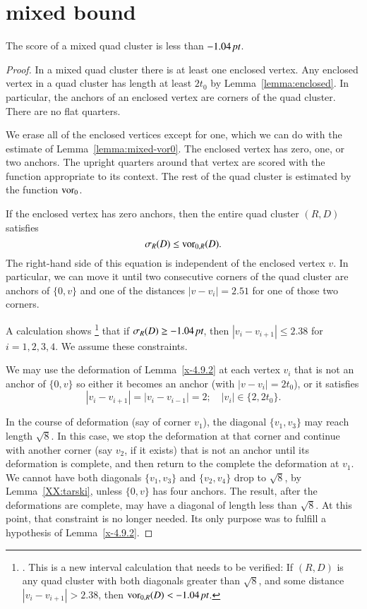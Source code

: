 \section{mixed bound} %

\begin{lemma} \label{lemma:1.04}
The score of a mixed quad cluster is less than $-1.04\,\hbox{\it pt}$.
\end{lemma}

\begin{proof}
In a mixed quad cluster there is at least one enclosed vertex.
Any enclosed vertex in a quad cluster has length at least $2t_0$
by Lemma~\ref{lemma:enclosed}. In particular, the anchors of an
enclosed vertex are corners of the quad cluster. There are no flat
quarters.

We erase all of the enclosed vertices except for one, which
we can do with the estimate of Lemma~\ref{lemma:mixed-vor0}.
The enclosed vertex has zero, one, or two anchors.  The upright
quarters around that vertex are scored with the function appropriate
to its context.
The rest of the quad cluster is estimated by the function $\operatorname{vor}_0$.

If the enclosed vertex has zero anchors, then the entire quad
cluster $(R,D)$ satisfies $$\sigma_R(D)\le \operatorname{vor}_{0,R}(D).$$
The right-hand side of this equation is independent of the enclosed
vertex $v$.  In particular, we can move it until 
two consecutive  corners of the quad cluster are anchors of $\{0,v\}$
and one of the distances $|v-v_i|=2.51$ for one of those two corners.

A calculation shows%
\footnote{. This is a new interval calculation that
needs to be verified: If $(R,D)$ is any quad cluster with both
diagonals greater than $\sqrt8$, and some distance $|v_i-v_{i+1}|>2.38$,
then $\operatorname{vor}_{0,R}(D) < -1.04\,\hbox{\it pt}$.} 
that if $\sigma_R(D) \ge -1.04\,\hbox{\it pt}$, then 
$|v_i-v_{i+1}|\le 2.38$ for $i=1,2,3,4$.  We assume these
constraints.

We may use the deformation of Lemma~\ref{x-4.9.2}
at each vertex $v_i$ that is not an anchor of $\{0,v\}$ so either
it becomes an anchor (with $|v-v_i|=2t_0$), or it satisfies
  $$|v_i-v_{i+1}|=|v_i-v_{i-1}|=2;\quad |v_i|\in\{2,2t_0\}.$$ 

In the course of deformation (say of corner $v_1$),  
the diagonal $\{v_1,v_3\}$ may reach length $\sqrt8$.  
In this case, we stop
the deformation at that corner and continue with another
corner (say $v_2$, if it exists)
that is not an anchor until its deformation
is complete, and then return to the complete the deformation
at $v_1$.  We cannot have both diagonals $\{v_1,v_3\}$ and $\{v_2,v_4\}$
drop to $\sqrt8$, by Lemma~\ref{XX:tarski}, unless $\{0,v\}$ has four
anchors.  The result, after the deformations are complete, may
have a diagonal of length less than $\sqrt8$.  At this point,
that constraint is no longer needed.  Its only purpose was to
fulfill a hypothesis of Lemma~\ref{x-4.9.2}.


\end{proof}
